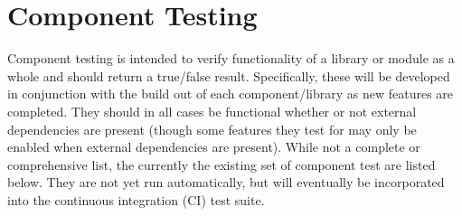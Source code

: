 %
%
\section{Component Testing}
\label{sec:component}

Component testing is intended to verify functionality of a library or module as a whole and should return a true/false result. Specifically, these will
be developed in conjunction with the build out of each component/library as new features are completed. They should in all
cases be functional whether or not external dependencies are present (though some features they test for may only be enabled
when external dependencies are present). While not a complete or comprehensive list, the currently the existing set of component test are listed below. 
They are not yet run automatically, but will eventually be incorporated into the continuous integration (CI) test suite.


